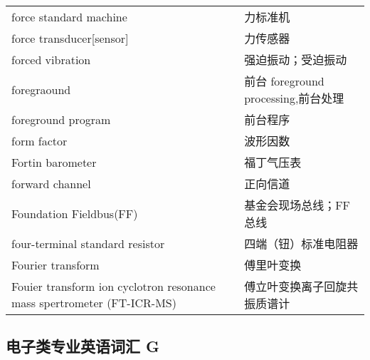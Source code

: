 \documentclass[
]{article}
\begin{document}
\begin{longtable}[]{@{}ll@{}}
force standard machine & 力标准机 \\
force transducer{[}sensor{]} & 力传感器 \\
forced vibration & 强迫振动；受迫振动 \\
foregraound & 前台 foreground processing,前台处理 \\
foreground program & 前台程序 \\
form factor & 波形因数 \\
Fortin barometer & 福丁气压表 \\
forward channel & 正向信道 \\
Foundation Fieldbus(FF) & 基金会现场总线；FF总线 \\
four-terminal standard resistor & 四端（钮）标准电阻器 \\
Fourier transform & 傅里叶变换 \\
Fouier transform ion cyclotron resonance mass spertrometer (FT-ICR-MS) &
傅立叶变换离子回旋共振质谱计 \\
\bottomrule()
\end{longtable}

\hypertarget{ux7535ux5b50ux7c7bux4e13ux4e1aux82f1ux8bedux8bcdux6c47-g}{%
\subsection{\texorpdfstring{电子类专业英语词汇 G
}{电子类专业英语词汇 G }}\label{ux7535ux5b50ux7c7bux4e13ux4e1aux82f1ux8bedux8bcdux6c47-g}}
\end{document}
